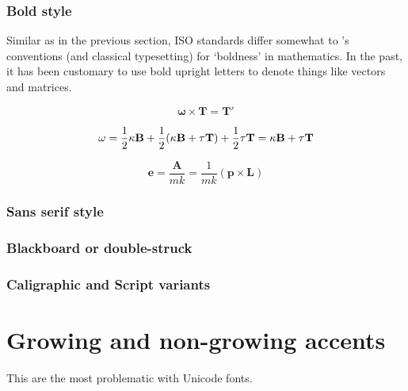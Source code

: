 \subsubsection{Bold style}

Similar as in the previous section, ISO standards differ somewhat to \tex’s conventions
(and classical typesetting) for ‘boldness’ in mathematics. In the past, it has
been customary to use bold upright letters to denote things like vectors and matrices.


$$\boldsymbol{\omega} \times \mathbf{T} = \mathbf{T'}$$

$$\mathbf{\omega} = {1\over 2}\kappa \mathbf{B} + {1\over 2}(\kappa \mathbf{B} + \tau \mathbf{T}) + {1\over 2}\tau \mathbf{T} = \kappa \mathbf{B} + \tau \mathbf{T}
$$

\[
\mathbf{e} = \frac{\mathbf{A}}{m k} = \frac{1}{m k}(\mathbf{p} \times \mathbf{L})
\]

\subsubsection{Sans serif style}

\subsubsection{Blackboard or double-struck}



\subsubsection{Caligraphic and Script variants}



\section{Growing and non-growing accents}

This are the most problematic with Unicode fonts.



%





